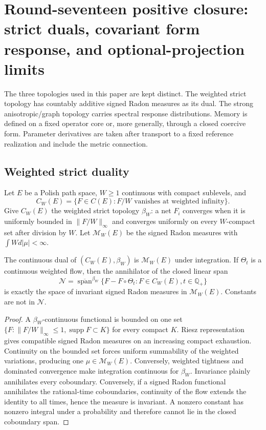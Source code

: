 \section{Round-seventeen positive closure: strict duals, covariant form response, and optional-projection limits}
\label{sec:r17-c2}

The three topologies used in this paper are kept distinct.  The weighted
strict topology has countably additive signed Radon measures as its dual.  The
strong anisotropic/graph topology carries spectral response distributions.
Memory is defined on a fixed operator core or, more generally, through a
closed coercive form.  Parameter derivatives are taken after transport to a
fixed reference realization and include the metric connection.

\subsection{Weighted strict duality}

Let $E$ be a Polish path space, $W\ge1$ continuous with compact sublevels, and
\[
 C_W(E)=\{F\in C(E):F/W\text{ vanishes at weighted infinity}\}.
\]
Give $C_W(E)$ the weighted strict topology $\beta_W$: a net $F_i$ converges
when it is uniformly bounded in $\|F/W\|_\infty$ and converges uniformly on
every $W$-compact set after division by $W$.  Let
$\mathcal M_W(E)$ be the signed Radon measures with
$\int Wd|\mu|<\infty$.

\begin{theorem}
\label{thm:r17-c2-dual}
The continuous dual of $(C_W(E),\beta_W)$ is $\mathcal M_W(E)$ under
integration.  If $\Theta_t$ is a continuous weighted flow, then the
annihilator of the closed linear span
\[
 \mathscr N=\overline{\operatorname{span}}^{\beta_W}
 \{F-F\circ\Theta_t:F\in C_W(E),t\in\mathbb Q_+\}
\]
is exactly the space of invariant signed Radon measures in
$\mathcal M_W(E)$.  Constants are not in $\mathscr N$.
\end{theorem}

\begin{proof}
A $\beta_W$-continuous functional is bounded on one set
$\{F:\|F/W\|_\infty\le1,\operatorname{supp}F\subset K\}$
for every compact $K$.  Riesz representation gives compatible signed Radon
measures on an increasing compact exhaustion.  Continuity on the bounded set
forces uniform summability of the weighted variations, producing one
$\mu\in\mathcal M_W(E)$.  Conversely, weighted tightness and dominated
convergence make integration continuous for $\beta_W$.  Invariance plainly
annihilates every coboundary.  Conversely, if a signed Radon functional
annihilates the rational-time coboundaries, continuity of the flow extends the
identity to all times, hence the measure is invariant.  A nonzero constant
has nonzero integral under a probability and therefore cannot lie in the
closed coboundary span.
\end{proof}

